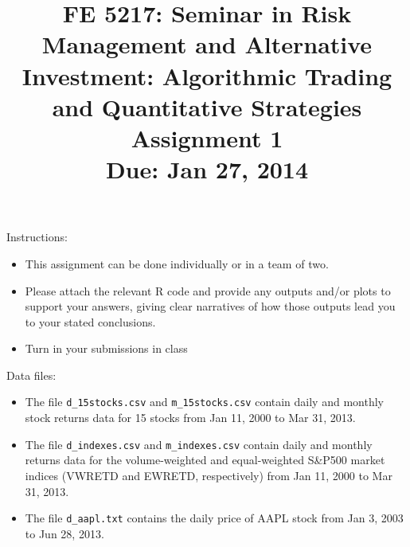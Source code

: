 \documentclass[11pt]{article}
\title{FE 5217: Seminar in Risk Management and Alternative Investment: Algorithmic Trading and Quantitative Strategies\\\vspace{5mm}Assignment 1\\\vspace{10mm}Due: Jan 27, 2014}
\date{}
\begin{document}
\maketitle

Instructions:
\begin{itemize}
\itemsep 3mm
\item This assignment can be done individually or in a team of two.
\item Please attach the relevant R code and provide any outputs and/or plots to support your answers, giving clear narratives of how those outputs lead you to your stated conclusions.
\item Turn in your submissions in class
\end{itemize}

\vspace{5mm}
Data files:
\begin{itemize}
\item The file {\tt d\_15stocks.csv} and {\tt m\_15stocks.csv} contain daily and monthly stock returns data for 15 stocks from Jan 11, 2000 to Mar 31, 2013.
\item The file {\tt d\_indexes.csv} and {\tt m\_indexes.csv} contain daily and monthly returns data for the volume-weighted and equal-weighted S\&P500 market indices (VWRETD and EWRETD, respectively) from Jan 11, 2000 to Mar 31, 2013.
%

\item The file {\tt d\_aapl.txt} contains the daily price of AAPL stock from Jan 3, 2003 to Jun 28, 2013.

\end{itemize}
\pagebreak
\end{document}
